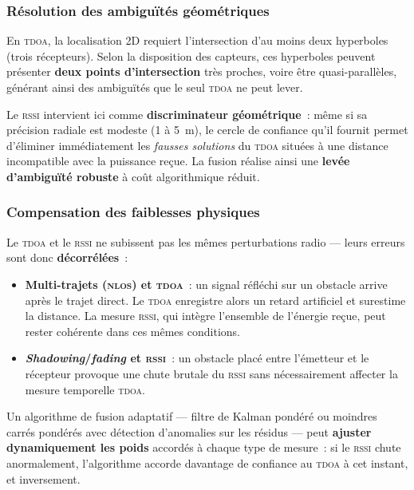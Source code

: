 \documentclass[12pt, a4paper]{article}
\newcommand{\TDOA}{\textsc{tdoa}}
\newcommand{\RSSI}{\textsc{rssi}}
\newcommand{\NLOS}{\textsc{nlos}}
\begin{document}
\subsubsection{Résolution des ambiguïtés géométriques}

En \TDOA{}, la localisation 2D requiert l'intersection d'au moins deux hyperboles
(trois récepteurs). Selon la disposition des capteurs, ces hyperboles peuvent présenter
\textbf{deux points d'intersection} très proches, voire être quasi-parallèles,
générant ainsi des ambiguïtés que le seul \TDOA{} ne peut lever.

Le \RSSI{} intervient ici comme \textbf{discriminateur géométrique}~: même si sa
précision radiale est modeste (1 à 5~m), le cercle de confiance qu'il fournit
permet d'éliminer immédiatement les \textit{fausses solutions} du \TDOA{} situées
à une distance incompatible avec la puissance reçue. La fusion réalise ainsi une
\textbf{levée d'ambiguïté robuste} à coût algorithmique réduit.

\subsubsection{Compensation des faiblesses physiques}

Le \TDOA{} et le \RSSI{} ne subissent pas les mêmes perturbations radio — leurs
erreurs sont donc \textbf{décorrélées}~:

\begin{itemize}
  \item \textbf{Multi-trajets (\NLOS{}) et \TDOA{}}~: un signal réfléchi sur un
        obstacle arrive après le trajet direct. Le \TDOA{} enregistre alors un
        retard artificiel et surestime la distance. La mesure \RSSI{}, qui intègre
        l'ensemble de l'énergie reçue, peut rester cohérente dans ces mêmes
        conditions.
  \item \textbf{\textit{Shadowing}/\textit{fading} et \RSSI{}}~: un obstacle
        placé entre l'émetteur et le récepteur provoque une chute brutale du \RSSI{}
        sans nécessairement affecter la mesure temporelle \TDOA{}.
\end{itemize}

Un algorithme de fusion adaptatif --- filtre de Kalman pondéré ou moindres carrés
pondérés avec détection d'anomalies sur les résidus --- peut \textbf{ajuster
dynamiquement les poids} accordés à chaque type de mesure~: si le \RSSI{} chute
anormalement, l'algorithme accorde davantage de confiance au \TDOA{} à cet instant,
et inversement.
\end{document}

